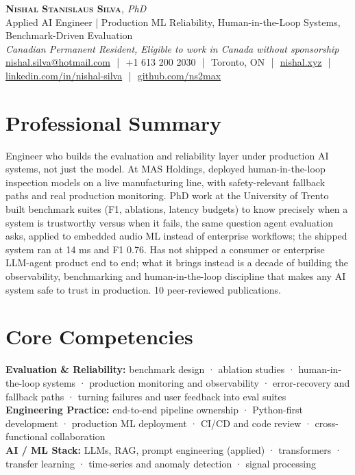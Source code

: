 \documentclass[11pt]{article}
\newcommand{\cvName}{Nishal Stanislaus Silva}
\newcommand{\cvStatus}{Canadian Permanent Resident, Eligible to work in Canada without sponsorship}
\newcommand{\cvTagline}{Applied AI Engineer | Production ML Reliability, Human-in-the-Loop Systems, Benchmark-Driven Evaluation}
\begin{document}
\pagestyle{empty}
\begin{center}
    {\LARGE \scshape \textbf{\cvName}}{\large \textit{, PhD}}
    \\[1pt]
    {\small \cvTagline}
    \\[1pt]
    {\footnotesize\textit{\cvStatus}}
    \\[1pt]
    {\small
    \href{mailto:nishal.silva@hotmail.com}{nishal.silva@hotmail.com}
    \,\,|\,\, +1 613 200 2030
    \,\,|\,\, Toronto, ON
    \,\,|\,\, \href{https://nishal.xyz}{nishal.xyz}
    \,\,|\,\, \href{https://www.linkedin.com/in/nishal-silva}{linkedin.com/in/nishal-silva}
    \,\,|\,\, \href{https://github.com/ns2max}{github.com/ns2max}}
\end{center}

\section*{Professional Summary}

Engineer who builds the evaluation and reliability layer under production AI systems, not just the model. At MAS Holdings, deployed human-in-the-loop inspection models on a live manufacturing line, with safety-relevant fallback paths and real production monitoring. PhD work at the University of Trento built benchmark suites (F1, ablations, latency budgets) to know precisely when a system is trustworthy versus when it fails, the same question agent evaluation asks, applied to embedded audio ML instead of enterprise workflows; the shipped system ran at 14 ms and F1 0.76. Has not shipped a consumer or enterprise LLM-agent product end to end; what it brings instead is a decade of building the observability, benchmarking and human-in-the-loop discipline that makes any AI system safe to trust in production. 10 peer-reviewed publications.

\section*{Core Competencies}

\textbf{Evaluation \& Reliability:} benchmark design · ablation studies · human-in-the-loop systems · production monitoring and observability · error-recovery and fallback paths · turning failures and user feedback into eval suites\\
\textbf{Engineering Practice:} end-to-end pipeline ownership · Python-first development · production ML deployment · CI/CD and code review · cross-functional collaboration\\
\textbf{AI / ML Stack:} LLMs, RAG, prompt engineering (applied) · transformers · transfer learning · time-series and anomaly detection · signal processing
\end{document}
